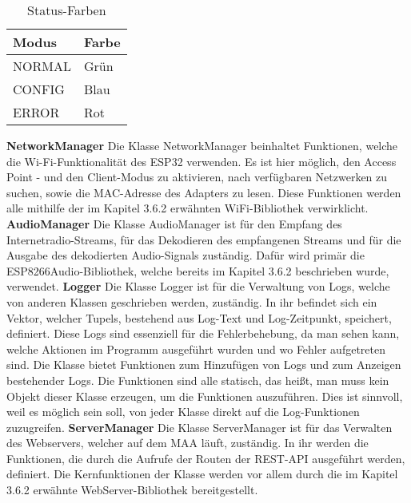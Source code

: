 \documentclass[11pt, twoside]{article}
\begin{document}
\begin{table}[H]
	\begin{tabular}{|l|l|}
		\hline
		\textbf{Modus} & \textbf{Farbe} \\
		\hline
		NORMAL & Grün \\
		\hline
		CONFIG & Blau \\
		\hline
		ERROR & Rot \\
		\hline
	\end{tabular}
	\caption{Status-Farben}
\end{table}
\noindent %
\textbf{NetworkManager}\newline
Die Klasse \glqq NetworkManager\grqq{} beinhaltet Funktionen, welche die Wi-Fi-Funktionalität des ESP32 verwenden. Es ist hier möglich, den Access Point - und den Client-Modus zu aktivieren, nach verfügbaren Netzwerken zu suchen, sowie die MAC-Adresse des Adapters zu lesen. Diese Funktionen werden alle mithilfe der im Kapitel 3.6.2 erwähnten \glqq WiFi\grqq{}-Bibliothek verwirklicht.
\vspace{4mm}\newline
\textbf{AudioManager}\newline
Die Klasse \glqq AudioManager\grqq{} ist für den Empfang des Internetradio-Streams, für das Dekodieren des empfangenen Streams und für die Ausgabe des dekodierten Audio-Signals zuständig. Dafür wird primär die \glqq ESP8266Audio\grqq{}-Bibliothek, welche bereits im Kapitel 3.6.2 beschrieben wurde, verwendet.
\vspace{4mm}\newline
\textbf{Logger}\newline
Die Klasse \glqq Logger\grqq{} ist für die Verwaltung von Logs, welche von anderen Klassen geschrieben werden, zuständig. In ihr befindet sich ein Vektor, welcher Tupels, bestehend aus Log-Text und Log-Zeitpunkt, speichert, definiert. Diese Logs sind essenziell für die Fehlerbehebung, da man sehen kann, welche Aktionen im Programm ausgeführt wurden und wo Fehler aufgetreten sind. Die Klasse bietet Funktionen zum Hinzufügen von Logs und zum Anzeigen bestehender Logs. Die Funktionen sind alle statisch, das heißt, man muss kein Objekt dieser Klasse erzeugen, um die Funktionen auszuführen. Dies ist sinnvoll, weil es möglich sein soll, von jeder Klasse direkt auf die Log-Funktionen zuzugreifen.
\vspace{4mm}\newline
\textbf{ServerManager}\newline
Die Klasse \glqq ServerManager\grqq{} ist für das Verwalten des Webservers, welcher auf dem MAA läuft, zuständig. In ihr werden die Funktionen, die durch die Aufrufe der Routen der REST-API ausgeführt werden, definiert. Die Kernfunktionen der Klasse werden vor allem durch die im Kapitel 3.6.2 erwähnte \glqq WebServer\grqq{}-Bibliothek bereitgestellt.
\end{document}
